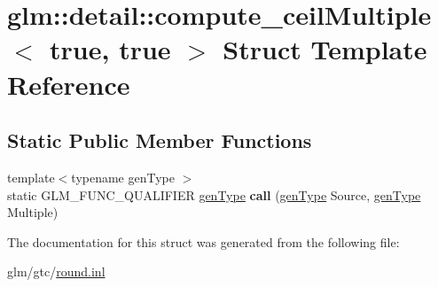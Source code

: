 \hypertarget{structglm_1_1detail_1_1compute__ceilMultiple_3_01true_00_01true_01_4}{\section{glm\-:\-:detail\-:\-:compute\-\_\-ceil\-Multiple$<$ true, true $>$ Struct Template Reference}
\label{structglm_1_1detail_1_1compute__ceilMultiple_3_01true_00_01true_01_4}
}
\subsection*{Static Public Member Functions}
\begin{DoxyCompactItemize}
\item 
\hypertarget{structglm_1_1detail_1_1compute__ceilMultiple_3_01true_00_01true_01_4_a6d9103207c947da13d0319d2d4d071d9}{{\footnotesize template$<$typename gen\-Type $>$ }\\static G\-L\-M\-\_\-\-F\-U\-N\-C\-\_\-\-Q\-U\-A\-L\-I\-F\-I\-E\-R \hyperlink{structglm_1_1detail_1_1genType}{gen\-Type} {\bfseries call} (\hyperlink{structglm_1_1detail_1_1genType}{gen\-Type} Source, \hyperlink{structglm_1_1detail_1_1genType}{gen\-Type} Multiple)}\label{structglm_1_1detail_1_1compute__ceilMultiple_3_01true_00_01true_01_4_a6d9103207c947da13d0319d2d4d071d9}

\end{DoxyCompactItemize}


The documentation for this struct was generated from the following file\-:\begin{DoxyCompactItemize}
\item 
glm/gtc/\hyperlink{round_8inl}{round.\-inl}\end{DoxyCompactItemize}
